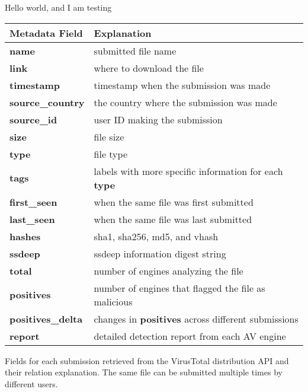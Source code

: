 Hello world, and I am testing

\begin{table}[h!]
\centering
\footnotesize
{
\begin{tabular}{l|l}
\hline
Metadata Field & Explanation \\
\hline                            
{\bf name}      & submitted file name \\
{\bf link}      & where to download the file \\
{\bf timestamp} & timestamp when the submission was made \\
{\bf source\_country} & the country where the submission was made \\
{\bf source\_id} & user ID making the submission\\
{\bf size} & file size \\
{\bf type} & file type \\
{\bf tags} & labels with more specific information for each {\bf type}\\
{\bf first\_seen} & when the same file was first submitted \\
{\bf last\_seen} & when the same file was last submitted \\
{\bf hashes} & sha1, sha256, md5, and vhash\\
{\bf ssdeep} & ssdeep information digest string \\
{\bf total} & number of engines analyzing the file \\
{\bf positives} & number of engines that flagged the file as malicious \\
{\bf positives\_delta} & changes in {\bf positives} across different submissions\\
{\bf report} & detailed detection report from each AV engine \\
\hline

\end{tabular}
}
{ 
Fields for each submission retrieved from the VirusTotal distribution API and their relation explanation.
The same file can be submitted multiple times by different users.
}
\end{table}


